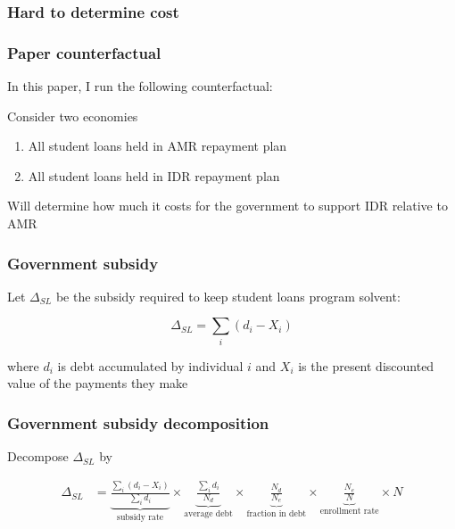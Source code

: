 \documentclass[10pt]{beamer}
\begin{document}
  \begin{frame} \frametitle{Hard to determine cost}


  \end{frame}

  \begin{frame} \frametitle{Paper counterfactual}

    In this paper, I run the following counterfactual:

    \vspace{0.25cm}

    Consider two economies

    \begin{enumerate}
      \item All student loans held in AMR repayment plan
      \item All student loans held in IDR repayment plan
    \end{enumerate}

    Will determine how much it costs for the government to support IDR relative to AMR

  \end{frame}

  \begin{frame} \frametitle{Government subsidy}

      Let $\Delta_{SL}$ be the subsidy required to keep student loans program solvent:

      \vspace{0.5cm}

      $$\Delta_{SL} = \sum_i (d_i - X_i)$$

      \vspace{0.5cm}

      where $d_i$ is debt accumulated by individual $i$ and $X_i$ is the present discounted value
      of the payments they make

  \end{frame}

  \begin{frame} \frametitle{Government subsidy decomposition}

      Decompose $\Delta_{SL}$ by

      \vspace{0.5cm}

      \begin{align*} \label{eq:gov_subsidy}
        \Delta_{SL} &=
            \underbrace{\frac{\sum_i (d_i - X_i)}{\sum_i d_i}}_{\text{subsidy rate}} \times
            \underbrace{\frac{\sum_i d_i}{N_d}}_{\text{average debt}} \times
            \underbrace{\frac{N_d}{N_e}}_{\text{fraction in debt}} \times
            \underbrace{\frac{N_e}{N}}_{\text{enrollment rate}} \times
            N
      \end{align*}

  \end{frame}
\end{document}
